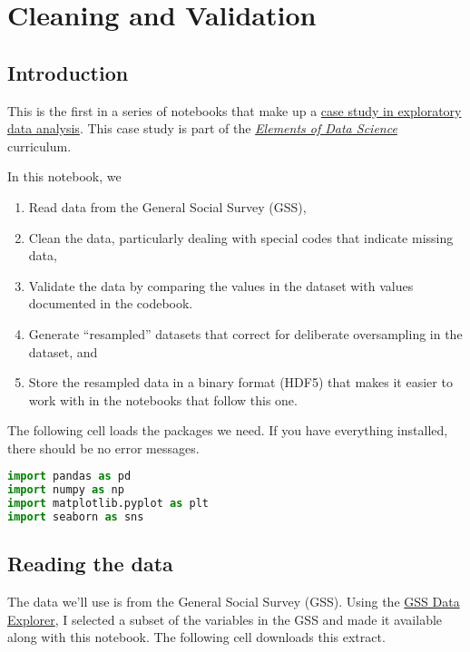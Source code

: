 \hypertarget{cleaning-and-validation}{%
\chapter{Cleaning and Validation}\label{cleaning-and-validation}}

\hypertarget{introduction}{%
\section{Introduction}\label{introduction}}

This is the first in a series of notebooks that make up a
\href{https://allendowney.github.io/PoliticalAlignmentCaseStudy/}{case
study in exploratory data analysis}. This case study is part of the
\href{https://allendowney.github.io/ElementsOfDataScience/}{\emph{Elements
of Data Science}} curriculum.

In this notebook, we

\begin{enumerate}
\def\labelenumi{\arabic{enumi}.}
\item
  Read data from the General Social Survey (GSS),
\item
  Clean the data, particularly dealing with special codes that indicate
  missing data,
\item
  Validate the data by comparing the values in the dataset with values
  documented in the codebook.
\item
  Generate ``resampled'' datasets that correct for deliberate
  oversampling in the dataset, and
\item
  Store the resampled data in a binary format (HDF5) that makes it
  easier to work with in the notebooks that follow this one.
\end{enumerate}

The following cell loads the packages we need. If you have everything
installed, there should be no error messages.

\begin{lstlisting}[language=Python]
import pandas as pd
import numpy as np
import matplotlib.pyplot as plt
import seaborn as sns
\end{lstlisting}

\hypertarget{reading-the-data}{%
\section{Reading the data}\label{reading-the-data}}

The data we'll use is from the General Social Survey (GSS). Using the
\href{https://gssdataexplorer.norc.org/projects/52787}{GSS Data
Explorer}, I selected a subset of the variables in the GSS and made it
available along with this notebook. The following cell downloads this
extract.

